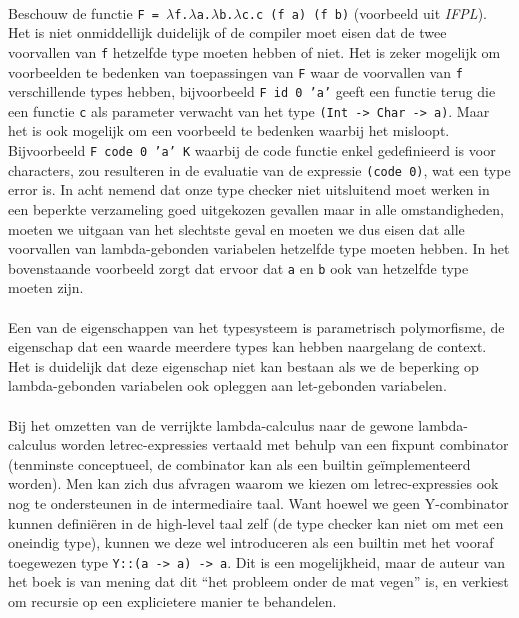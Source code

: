 \documentclass[a4paper,10pt]{article}
\begin{document}
\paragraph{}
Beschouw de functie \texttt{F = $\lambda$f.$\lambda$a.$\lambda$b.$\lambda$c.c (f a) (f b)} (voorbeeld uit \emph{IFPL}).
Het is niet onmiddellijk duidelijk of de compiler moet eisen dat de twee voorvallen van \texttt{f} hetzelfde type moeten hebben of niet.
Het is zeker mogelijk om voorbeelden te bedenken van toepassingen van \texttt{F} waar de voorvallen van \texttt{f} verschillende types hebben, bijvoorbeeld \texttt{F id 0 'a'} geeft een functie terug die een functie \texttt{c} als parameter verwacht van het type \texttt{(Int -> Char -> a)}.
Maar het is ook mogelijk om een voorbeeld te bedenken waarbij het misloopt.
Bijvoorbeeld \texttt{F code 0 'a' K} waarbij de code functie enkel gedefinieerd is voor characters, zou resulteren in de evaluatie van de expressie \texttt{(code 0)}, wat een type error is.
In acht nemend dat onze type checker niet uitsluitend moet werken in een beperkte verzameling goed uitgekozen gevallen maar in alle omstandigheden, moeten we uitgaan van het slechtste geval en moeten we dus eisen dat alle voorvallen van lambda-gebonden variabelen hetzelfde type moeten hebben.
In het bovenstaande voorbeeld zorgt dat ervoor dat \texttt{a} en \texttt{b} ook van hetzelfde type moeten zijn.
\paragraph{}
Een van de eigenschappen van het typesysteem is parametrisch polymorfisme, de eigenschap dat een waarde meerdere types kan hebben naargelang de context.
Het is duidelijk dat deze eigenschap niet kan bestaan als we de beperking op lambda-gebonden variabelen ook opleggen aan let-gebonden variabelen.
\paragraph{}
Bij het omzetten van de verrijkte lambda-calculus naar de gewone lambda-calculus worden letrec-expressies vertaald met behulp van een fixpunt combinator (tenminste conceptueel, de combinator kan als een builtin ge{\"i}mplementeerd worden).
Men kan zich dus afvragen waarom we kiezen om letrec-expressies ook nog te ondersteunen in de intermediaire taal.
Want hoewel we geen Y-combinator kunnen defini{\"e}ren in de high-level taal zelf (de type checker kan niet om met een oneindig type), kunnen we deze wel introduceren als een builtin met het vooraf toegewezen type \texttt{Y::(a -> a) -> a}.
Dit is een mogelijkheid, maar de auteur van het boek is van mening dat dit ``het probleem onder de mat vegen'' is, en verkiest om recursie op een explicietere manier te behandelen.
\end{document}

